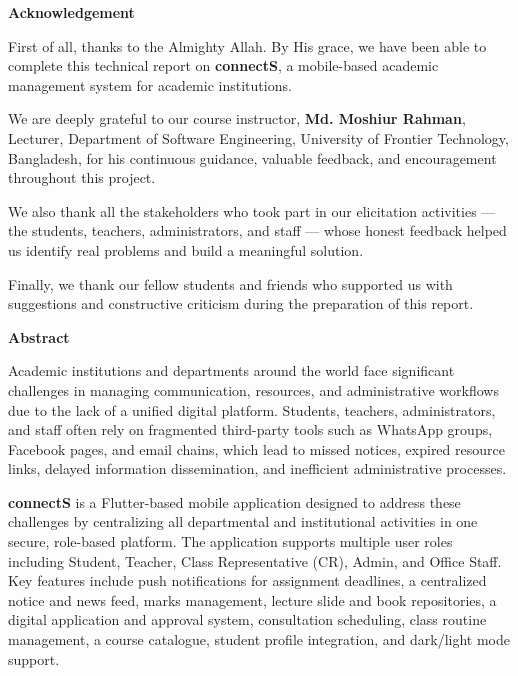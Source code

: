 \documentclass[12pt,a4paper]{article}
\begin{document}
\thispagestyle{plain}
\begin{center}{\large\bfseries\color{navyblue} Acknowledgement}\end{center}
\vspace{0.5em}

First of all, thanks to the Almighty Allah. By His grace, we have been able to complete this technical report on \textbf{connectS}, a mobile-based academic management system for academic institutions.

We are deeply grateful to our course instructor, \textbf{Md. Moshiur Rahman}, Lecturer, Department of Software Engineering, University of Frontier Technology, Bangladesh, for his continuous guidance, valuable feedback, and encouragement throughout this project.

We also thank all the stakeholders who took part in our elicitation activities --- the students, teachers, administrators, and staff --- whose honest feedback helped us identify real problems and build a meaningful solution.

Finally, we thank our fellow students and friends who supported us with suggestions and constructive criticism during the preparation of this report.
\newpage

\thispagestyle{plain}
\begin{center}{\large\bfseries\color{navyblue} Abstract}\end{center}
\vspace{0.5em}

Academic institutions and departments around the world face significant challenges in managing communication, resources, and administrative workflows due to the lack of a unified digital platform. Students, teachers, administrators, and staff often rely on fragmented third-party tools such as WhatsApp groups, Facebook pages, and email chains, which lead to missed notices, expired resource links, delayed information dissemination, and inefficient administrative processes.

\textbf{connectS} is a Flutter-based mobile application designed to address these challenges by centralizing all departmental and institutional activities in one secure, role-based platform. The application supports multiple user roles including Student, Teacher, Class Representative (CR), Admin, and Office Staff. Key features include push notifications for assignment deadlines, a centralized notice and news feed, marks management, lecture slide and book repositories, a digital application and approval system, consultation scheduling, class routine management, a course catalogue, student profile integration, and dark/light mode support.
\end{document}
